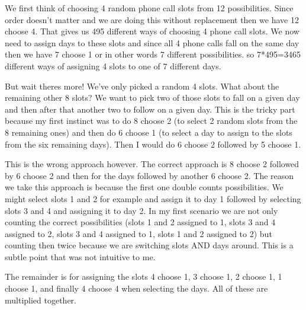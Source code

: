 \begin{enumerate}
We first think of choosing 4 random phone call slots from 12 possibilities. Since order doesn't matter and we are doing this without replacement then we have 12 choose 4. That gives us 495 different ways of choosing 4 phone call slots. We now need to assign days to these slots and since all 4 phone calls fall on the same day then we have 7 choose 1 or in other words 7 different possibilities. so 7*495=3465 different ways of assigning 4 slots to one of 7 different days. 

But wait theres more! We've only picked a random 4 slots. What about the remaining other 8 slots? We want to pick two of those slots to fall on a given day and then after that another two to follow on a given day. This is the tricky part because my first instinct was to do 8 choose 2 (to select 2 random slots from the 8 remaining ones) and then do 6 choose 1 (to select a day to assign to the slots from the six remaining days). Then I would do 6 choose 2 followed by 5 choose 1. 

This is the wrong approach however. The correct approach is 8 choose 2 followed by 6 choose 2 and then for the days followed by another 6 choose 2. The reason we take this approach is because the first one double counts possibilities. We might select slots 1 and 2 for example and assign it to day 1 followed by selecting slots 3 and 4 and assigning it to day 2. In my first scenario we are not only counting the correct possibilities (slots 1 and 2 assigned to 1, slots 3 and 4 assigned to 2,  slots 3 and 4 assigned to 1, slots 1 and 2 assigned to 2) but counting then twice because we are switching slots AND days around. This is a subtle point that was not intuitive to me. 

The remainder is for assigning the slots 4 choose 1, 3 choose 1, 2 choose 1, 1 choose 1, and finally 4 choose 4 when selecting the days. All of these are multiplied together. 



\end{enumerate}